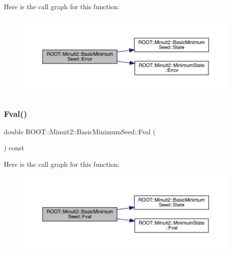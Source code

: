 Here is the call graph for this function\+:
\nopagebreak
\begin{figure}[H]
\begin{center}
\leavevmode
\includegraphics[width=350pt]{de/d50/classROOT_1_1Minuit2_1_1BasicMinimumSeed_a108de61cfe9f1766c3d7e251202a29df_cgraph}
\end{center}
\end{figure}
\mbox{\label{classROOT_1_1Minuit2_1_1BasicMinimumSeed_a40b43b611717121256cd72bf40a3d5d7}} 
\subsubsection{\texorpdfstring{Fval()}{Fval()}\hspace{0.1cm}{\footnotesize\ttfamily [1/2]}}
{\footnotesize\ttfamily double R\+O\+O\+T\+::\+Minuit2\+::\+Basic\+Minimum\+Seed\+::\+Fval (\begin{DoxyParamCaption}{ }\end{DoxyParamCaption}) const\hspace{0.3cm}{\ttfamily [inline]}}

Here is the call graph for this function\+:
\nopagebreak
\begin{figure}[H]
\begin{center}
\leavevmode
\includegraphics[width=350pt]{de/d50/classROOT_1_1Minuit2_1_1BasicMinimumSeed_a40b43b611717121256cd72bf40a3d5d7_cgraph}
\end{center}
\end{figure}
\mbox{\label{classROOT_1_1Minuit2_1_1BasicMinimumSeed_a40b43b611717121256cd72bf40a3d5d7}} 
